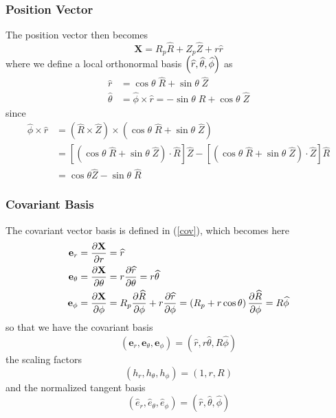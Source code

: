 \subsubsection{Position Vector}

The position vector then becomes 
\begin{equation}
\mathbf{X}=R_{p}\widehat{R}+Z_{p}\widehat{Z}+r\widehat{r}
\end{equation}
where we define a local orthonormal basis $\left( \widehat{r},\widehat {%
\theta},\widehat{\phi}\right) $ as 
\begin{align}
\widehat{r} & =\cos\theta\;\widehat{R}+\sin\theta\;\widehat{Z} \\
\widehat{\theta} & =\widehat{\phi}\times\widehat{r}=-\sin\theta\;\widehat {R}%
+\cos\theta\;\widehat{Z}
\end{align}
since 
\begin{align}
\widehat{\phi}\times\widehat{r} & =\left( \widehat{R}\times\widehat {Z}%
\right) \times\left( \cos\theta\;\widehat{R}+\sin\theta\;\widehat {Z}\right)
\\
& =\left[ \left( \cos\theta\;\widehat{R}+\sin\theta\;\widehat{Z}\right) \cdot%
\widehat{R}\right] \widehat{Z}-\left[ \left( \cos\theta\;\widehat {R}%
+\sin\theta\;\widehat{Z}\right) \cdot\widehat{Z}\right] \widehat{R} \\
& =\cos\theta\widehat{Z}-\sin\theta\;\widehat{R}
\end{align}

\subsubsection{Covariant Basis}

The covariant vector basis is defined in (\ref{cov}), which becomes here 
\begin{align}
\mathbf{e}_{r} & =\frac{\partial\mathbf{X}}{\partial r}=\widehat{r} \\
\mathbf{e}_{\theta} & =\frac{\partial\mathbf{X}}{\partial\theta}=r\frac{%
\partial\widehat{r}}{\partial\theta}=r\widehat{\theta} \\
\mathbf{e}_{\phi} & =\frac{\partial\mathbf{X}}{\partial\phi}=R_{p}\frac{%
\partial\widehat{R}}{\partial\phi}+r\frac{\partial\widehat{r}}{\partial\phi}%
=\left( R_{p}+r\cos\theta\right) \frac{\partial\widehat{R}}{\partial\phi}=R%
\widehat{\phi}
\end{align}
so that we have the covariant basis 
\begin{equation}
\left( \mathbf{e}_{r},\mathbf{e}_{\theta},\mathbf{e}_{\phi}\right) =\left( 
\widehat{r},r\widehat{\theta},R\widehat{\phi}\right)
\end{equation}
the scaling factors 
\begin{equation}
\left( h_{r},h_{\theta},h_{\phi}\right) =\left( 1,r,R\right)
\end{equation}
and the normalized tangent basis 
\begin{equation}
\left( \widehat{e}_{r},\widehat{e}_{\theta},\widehat{e}_{\phi}\right)
=\left( \widehat{r},\widehat{\theta},\widehat{\phi}\right)
\end{equation}

